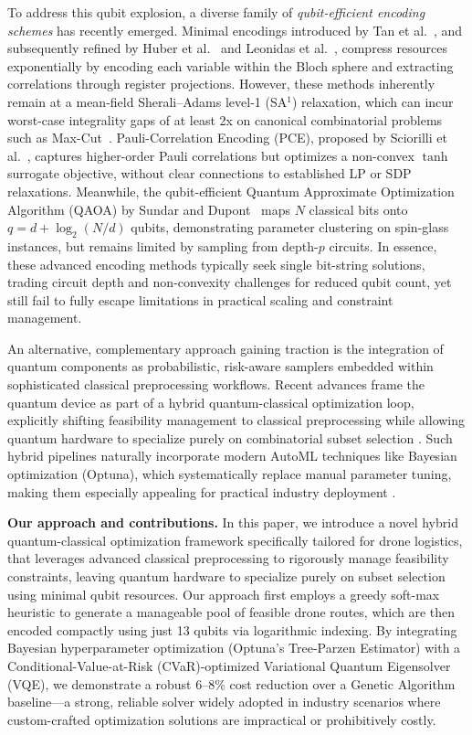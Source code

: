 To address this qubit explosion, a diverse family of \emph{qubit-efficient encoding schemes} has recently emerged.
Minimal encodings introduced by Tan et al.~\cite{tan_qubit-efficient_2021}, 
and subsequently refined by Huber et al.~\cite{huber_exponential_2024} and Leonidas et al.~\cite{leonidas_qubit_2024}, 
compress resources exponentially by encoding each variable within the Bloch sphere 
and extracting correlations through register projections.
However, these methods inherently remain at a mean-field Sherali–Adams level-1 (SA\(^1\)) relaxation,
which can incur worst-case integrality gaps of at least 2x on canonical combinatorial problems such as Max-Cut~\cite{charikar_integrality_2009}.
Pauli-Correlation Encoding (PCE), proposed by Sciorilli et al.~\cite{sciorilli_towards_2025}, 
captures higher-order Pauli correlations but optimizes a non-convex \(\tanh\) surrogate objective, 
without clear connections to established LP or SDP relaxations.
Meanwhile, the qubit-efficient Quantum Approximate Optimization Algorithm (QAOA) by Sundar and Dupont~\cite{sundar_qubit-efficient_2024} 
maps \(N\) classical bits onto \(q = d + \log_2(N/d)\) qubits, demonstrating parameter clustering on spin-glass instances, 
but remains limited by sampling from depth-\(p\) circuits.
In essence, these advanced encoding methods typically seek single bit-string solutions, 
trading circuit depth and non-convexity challenges for reduced qubit count, yet still fail to fully escape
limitations in practical scaling and constraint management.

An alternative, complementary approach gaining traction is the integration of quantum components as
probabilistic, risk-aware samplers embedded within sophisticated classical preprocessing workflows.
Recent advances frame the quantum device as part of a hybrid quantum-classical optimization loop,
explicitly shifting feasibility management to classical preprocessing while allowing quantum
hardware to specialize purely on combinatorial subset selection \cite{matsuyama2025,albarran2024}.
Such hybrid pipelines naturally incorporate modern AutoML techniques like Bayesian optimization (Optuna),
which systematically replace manual parameter tuning, 
making them especially appealing for practical industry deployment \cite{akiba_optuna_2019,tibaldi_bayes_qaoa_2023,caramanis2023}.

\textbf{Our approach and contributions.} 
In this paper, we introduce a novel hybrid quantum-classical optimization framework specifically tailored for drone logistics,
that leverages advanced classical preprocessing to rigorously manage feasibility constraints,
leaving quantum hardware to specialize purely on subset selection using minimal qubit resources.
Our approach first employs a greedy soft-max heuristic to generate a manageable pool of feasible drone routes,
which are then encoded compactly using just 13 qubits via logarithmic indexing.
By integrating Bayesian hyperparameter optimization (Optuna's Tree-Parzen Estimator) 
with a Conditional-Value-at-Risk (CVaR)-optimized Variational Quantum Eigensolver (VQE),
we demonstrate a robust 6–8\% cost reduction over a Genetic Algorithm baseline—a strong,
reliable solver widely adopted in industry scenarios where custom-crafted optimization
solutions are impractical or prohibitively costly.


